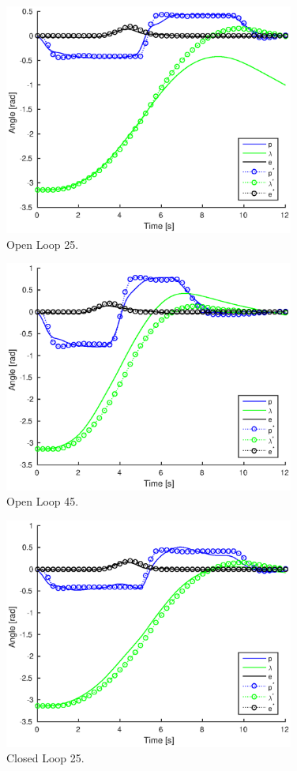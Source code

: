 \begin{figure}[hp]
	\centering
		\includegraphics[width=0.85\textwidth]{figures/4/openloop25.eps}
	\caption{Open Loop 25.}
	\label{fig:openloop25}
\end{figure}
\begin{figure}[hp]
	\centering
		\includegraphics[width=0.85\textwidth]{figures/4/openloop45.eps}
	\caption{Open Loop 45.}
	\label{fig:openloop45}
\end{figure}
\begin{figure}[hp]
	\centering
		\includegraphics[width=0.85\textwidth]{figures/4/closedloop25.eps}
	\caption{Closed Loop 25.}
	\label{fig:closedloop25}
\end{figure}
